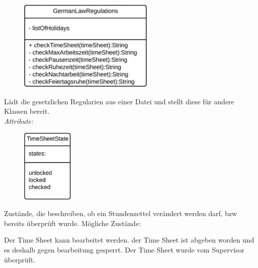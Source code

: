 \begin{itemize}
                \begin{figure}[htb]
                \centering
                \includegraphics[width=6.5cm]{Diagramms/class/singleclass/GermanReg.pdf}
                \end{figure}
                \newline
                Lädt die gesetzlichen Regularien aus einer Datei und stellt diese für andere Klassen bereit.\\
                \emph{Attribute:}
                    \begin{itemize}
                    \end{itemize}

            \newpage
                \begin{figure}[htb]
                \centering
                \includegraphics[width=2.5cm]{Diagramms/class/singleclass/TimeSheetState.pdf}
                \end{figure}
                \newline
                Zustände, die beschreiben, ob ein Stundenzettel verändert werden darf, bzw bereits überprüft wurde.
                Mögliche Zustände:
                \begin{itemize}
                        Der Time Sheet kann bearbeitet werden.
                        der Time Sheet ist abgeben worden und es deshalb gegen bearbeitung gesperrt.
                        Der Time Sheet wurde vom Supervisor überprüft.
                \end{itemize}


\end{itemize}

